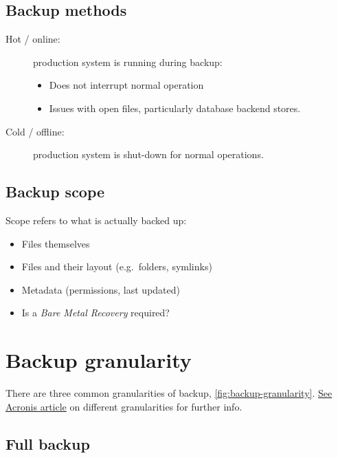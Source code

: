 \documentclass[slides]{pgnotes}
\begin{document}

\subsection{Backup methods}
\label{sec:backup-methods}

\begin{description}
\item[Hot / online:]
production system is running during backup:

\begin{itemize}
\item
  Does not interrupt normal operation
\item
  Issues with open files, particularly database backend stores.
\end{itemize}
\item[Cold / offline:]
production system is shut-down for normal operations.
\end{description}

\subsection{Backup scope}
\label{sec:backup-scope}

Scope refers to what is actually backed up:

\begin{itemize}
\item
  Files themselves
\item
  Files and their layout (e.g.~folders, symlinks)
\item
  Metadata (permissions, last updated)
\item
  Is a \emph{Bare Metal Recovery} required?
\end{itemize}

\section{Backup granularity}
\label{sec:backup-granularity}

There are three common granularities of backup, \autoref{fig:backup-granularity}.
\href{https://www.acronis.com/en-us/articles/incremental-differential-backups/}{See
Acronis article} on different granularities for further info.


\subsection{Full backup}
\label{sec:full-backup}
\end{document}
